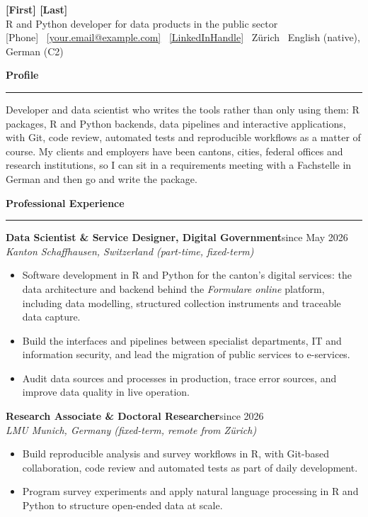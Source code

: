 \documentclass[10pt,a4paper]{article}
\newcommand{\cvsection}[1]{%
  \vspace{0.38em}\par
  {\color{cvblue}\large\bfseries #1}\par
  \vspace{-0.28em}\textcolor{cvblue}{\rule{\linewidth}{0.6pt}}\par
  \vspace{0.26em}}
\newcommand{\cventry}[3]{\vspace{0.32em}\textbf{#1}\hfill #3\\[1pt]\textit{#2}\par\vspace{0pt}}
\begin{document}
\pagestyle{empty}


{\Huge\bfseries [First] [Last]}\\[0.15em]
{\color{cvblue}\large R and Python developer for data products in the public sector}\\[0.5em]
[Phone] \textbullet\ \href{mailto:[your.email@example.com]}{[your.email@example.com]} \textbullet\ \href{[LinkedInURL]}{[LinkedInHandle]} \textbullet\ Zürich \textbullet\ English (native), German (C2)

\vspace{4pt}

\cvsection{Profile}

Developer and data scientist who writes the tools rather than only using them: R packages, R and Python backends, data pipelines and interactive applications, with Git, code review, automated tests and reproducible workflows as a matter of course. My clients and employers have been cantons, cities, federal offices and research institutions, so I can sit in a requirements meeting with a Fachstelle in German and then go and write the package.

\cvsection{Professional Experience}

\cventry{Data Scientist \& Service Designer, Digital Government}{Kanton Schaffhausen, Switzerland (part-time, fixed-term)}{since May 2026}
\begin{itemize}
\item Software development in R and Python for the canton's digital services: the data architecture and backend behind the \textit{Formulare online} platform, including data modelling, structured collection instruments and traceable data capture.
\item Build the interfaces and pipelines between specialist departments, IT and information security, and lead the migration of public services to e-services.
\item Audit data sources and processes in production, trace error sources, and improve data quality in live operation.
\end{itemize}

\cventry{Research Associate \& Doctoral Researcher}{LMU Munich, Germany (fixed-term, remote from Zürich)}{since 2026}
\begin{itemize}
\item Build reproducible analysis and survey workflows in R, with Git-based collaboration, code review and automated tests as part of daily development.
\item Program survey experiments and apply natural language processing in R and Python to structure open-ended data at scale.
\end{itemize}
\end{document}
